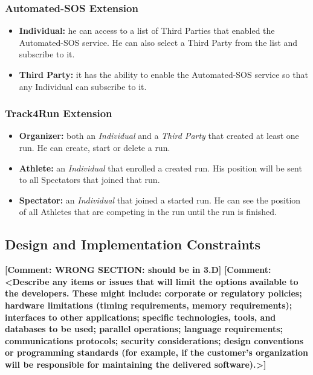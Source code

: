 \documentclass[a4paper]{article}
\newcommand{\comment}[1]{\textbf{[Comment: #1]}}
\begin{document}
        \subsubsection{Automated-SOS Extension}
        \begin{itemize}
            \item \textbf{Individual:} he can access to a list of Third Parties that enabled the Automated-SOS service. He can also select a Third Party from the list and subscribe to it.
            \item \textbf{Third Party:} it has the ability to enable the Automated-SOS service so that any Individual can subscribe to it.
        \end{itemize}
        
        \subsubsection{Track4Run Extension}
        \begin{itemize}
            \item \textbf{Organizer:} both an \textit{Individual} and a \textit{Third Party} that created at least one run. He can create, start or delete a run.
            \item \textbf{Athlete:} an \textit{Individual} that enrolled a created run. His position will be sent to all Spectators that joined that run.
            \item \textbf{Spectator:} an \textit{Individual} that joined a started run. He can see the position of all Athletes that are competing in the run until the run is finished.
        \end{itemize}
        
        
    
    \subsection{Design and Implementation Constraints}
    \comment{WRONG SECTION: should be in 3.D}
    \comment{<Describe any items or issues that will limit the options available to the developers. These might include: corporate or regulatory policies; hardware limitations (timing requirements, memory requirements); interfaces to other applications; specific technologies, tools, and databases to be used; parallel operations; language requirements; communications protocols; security considerations; design conventions or programming standards (for example, if the customer’s organization will be responsible for maintaining the delivered software).>}
    
\end{document}
